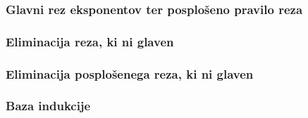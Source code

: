 \subsubsection{Glavni rez eksponentov ter posplošeno pravilo reza}


\subsubsection{Eliminacija reza, ki ni glaven} \label{non principal}


\subsubsection{Eliminacija posplošenega reza, ki ni glaven}


\subsubsection{Baza indukcije}

